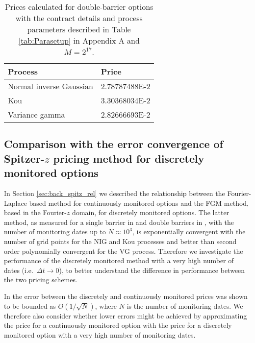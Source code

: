 \documentclass[11pt,a4paper]{article}
\begin{document}
\begin{table}[h]
\centering
\begin{tabular}{ll}
\hline\hline
Process & Price\\
\hline
Normal inverse Gaussian & 2.78787488E-2\\
Kou & 3.30368034E-2\\
Variance gamma & 2.82666693E-2\\
\hline\hline
\end{tabular}
\caption{Prices calculated for double-barrier options with the contract details and process parameters described in Table \ref{tab:Parasetup} in Appendix A and $M=2^{17}$.}
\label{tab:Doubres}
\end{table}
\FloatBarrier

\subsection{Comparison with the error convergence of Spitzer-$z$ pricing method for discretely monitored options}

In Section \ref{sec:back_spitz_rel} we described the relationship between the Fourier-Laplace based method for continuously monitored options and the FGM method, based in the Fourier-$z$ domain, for discretely monitored options. The latter method, as measured for a single barrier in \cite{Fusai2016} and double barriers in \cite{Phelan2017}, with the number of monitoring dates up to $N\approx10^3$, is exponentially convergent with the number of grid points for the NIG and Kou processes and better than second order polynomially convergent for the VG process. %
Therefore we investigate the performance of the discretely monitored method with a very high number of dates (i.e.~$\Delta t\rightarrow0$), to better understand the difference in performance between the two pricing schemes.

In \cite{Green2010} the error between the discretely and continuously monitored prices was shown to be bounded as $O(1/\sqrt{N})$, where $N$ is the number of monitoring dates.
We therefore also consider whether lower errors might be achieved by approximating the price for a continuously monitored option with the price for a discretely monitored option with a very high number of monitoring dates.
\end{document}
